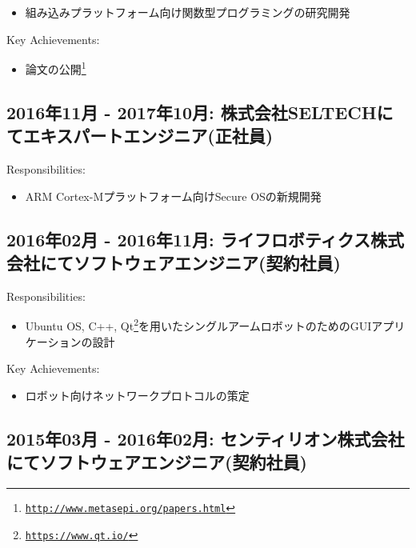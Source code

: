 \documentclass[letterpaper]{article}
\begin{document}
\begin{itemize}
  \item 組み込みプラットフォーム向け関数型プログラミングの研究開発
\end{itemize}

\noindent Key Achievements:

\begin{itemize}
  \item 論文の公開\footnote{\href{http://www.metasepi.org/papers.html}{\tt http://www.metasepi.org/papers.html}}
\end{itemize}

\subsection*{2016年11月 - 2017年10月: 株式会社SELTECHにてエキスパートエンジニア(正社員)}

\noindent Responsibilities:

\begin{itemize}
  \item ARM Cortex-Mプラットフォーム向けSecure OSの新規開発
\end{itemize}

\subsection*{2016年02月 - 2016年11月: ライフロボティクス株式会社にてソフトウェアエンジニア(契約社員)}

\noindent Responsibilities:

\begin{itemize}
  \item Ubuntu OS, C++, Qt\footnote{\href{https://www.qt.io/}{\tt https://www.qt.io/}}を用いたシングルアームロボットのためのGUIアプリケーションの設計
\end{itemize}

\noindent Key Achievements:

\begin{itemize}
  \item ロボット向けネットワークプロトコルの策定
\end{itemize}

\subsection*{2015年03月 - 2016年02月: センティリオン株式会社にてソフトウェアエンジニア(契約社員)}
\end{document}
